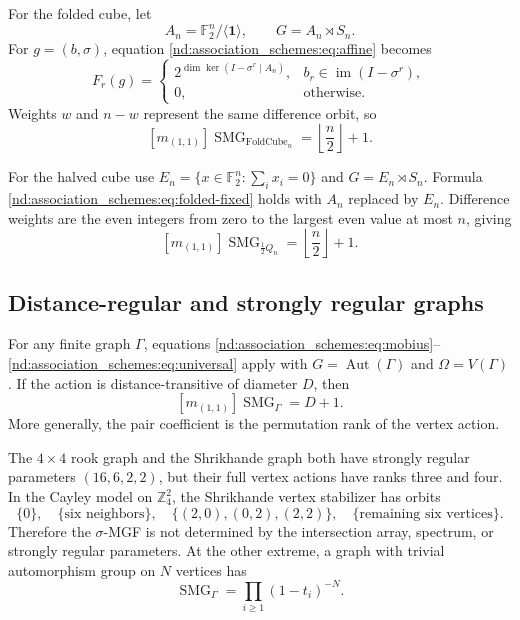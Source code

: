 \documentclass[10pt]{article}
\newcommand{\SMG}{\operatorname{SMG}}
\newcommand{\MGF}{\SMG}
\newcommand{\F}{\mathbb F}
\newcommand{\Aut}{\operatorname{Aut}}
\begin{document}
For the folded cube, let
\[
 A_n=\F_2^n/\langle\mathbf1\rangle,\qquad G=A_n\rtimes S_n.
\]
For $g=(b,\sigma)$, equation \eqref{nd:association_schemes:eq:affine} becomes
\begin{equation}\label{nd:association_schemes:eq:folded-fixed}
 F_r(g)=\begin{cases}
 2^{\dim\ker(I-\sigma^r\mid A_n)},&b_r\in\operatorname{im}(I-\sigma^r),\\
 0,&\text{otherwise}.
 \end{cases}
\end{equation}
Weights $w$ and $n-w$ represent the same difference orbit, so
\begin{equation}\label{nd:association_schemes:eq:folded-pair}
 \boxed{[m_{(1,1)}]\MGF_{\mathrm{FoldCube}_n}=\left\lfloor\frac n2\right\rfloor+1.}
\end{equation}

For the halved cube use
$E_n=\{x\in\F_2^n:\sum_i x_i=0\}$ and $G=E_n\rtimes S_n$.
Formula \eqref{nd:association_schemes:eq:folded-fixed} holds with $A_n$ replaced by $E_n$.
Difference weights are the even integers from zero to the largest even value
at most $n$, giving
\begin{equation}\label{nd:association_schemes:eq:halved-pair}
 \boxed{[m_{(1,1)}]\MGF_{\frac12Q_n}=\left\lfloor\frac n2\right\rfloor+1.}
\end{equation}

\subsection{Distance-regular and strongly regular graphs}

For any finite graph $\Gamma$, equations
\eqref{nd:association_schemes:eq:mobius}--\eqref{nd:association_schemes:eq:universal} apply with
$G=\Aut(\Gamma)$ and $\Omega=V(\Gamma)$.  If the action is
distance-transitive of diameter $D$, then
\begin{equation}\label{nd:association_schemes:eq:distance-pair}
 [m_{(1,1)}]\MGF_\Gamma=D+1.
\end{equation}
More generally, the pair coefficient is the permutation rank of the vertex
action.

The $4\times4$ rook graph and the Shrikhande graph both have strongly regular
parameters $(16,6,2,2)$, but their full vertex actions have ranks three and
four.  In the Cayley model on $\mathbb Z_4^2$, the Shrikhande vertex
stabilizer has orbits
\[
 \{0\},\quad \{\text{six neighbors}\},\quad
 \{(2,0),(0,2),(2,2)\},\quad \{\text{remaining six vertices}\}.
\]
Therefore the $\sigma$-MGF is not determined by the intersection array,
spectrum, or strongly regular parameters.  At the other extreme, a graph with
trivial automorphism group on $N$ vertices has
\[
 \MGF_\Gamma=\prod_{i\geq1}(1-t_i)^{-N}.
\]
\end{document}
